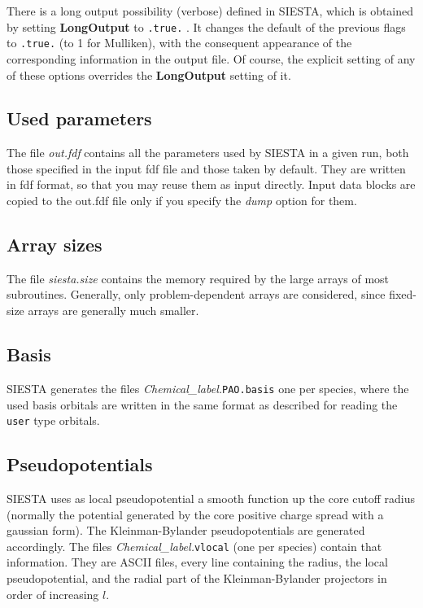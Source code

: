 There is a long output possibility (verbose) defined in SIESTA, which is
obtained by setting {\bf LongOutput} to {\tt .true.} . It changes 
the default of the previous flags to {\tt .true.} (to 1 for 
Mulliken), with the consequent appearance of the 
corresponding information in the output file.
Of course, the explicit setting of any of these options overrides the
{\bf LongOutput} setting of it.



\subsection{Used parameters}
The file {\it out.fdf} contains all the parameters used by SIESTA
in a given run, both those specified in the input fdf file and
those taken by default. They are written in fdf format, so that
you may reuse them as input directly. Input data blocks are 
copied to the out.fdf file only if you specify the {\it dump} option
for them.


\subsection{Array sizes}
 
The file {\it siesta.size} contains the memory required by the
large arrays of most subroutines. Generally, only problem-dependent
arrays are considered, since fixed-size arrays are generally much smaller.


\subsection{Basis}
SIESTA generates the files
{\it Chemical\_label.}{\tt PAO.basis}
one per species, where the used basis orbitals are written in the 
same format as described for reading the {\tt user} type orbitals.


\subsection{Pseudopotentials}
SIESTA uses as local pseudopotential a smooth function up the core cutoff
radius (normally the potential generated by the core positive charge 
spread with a gaussian form). The Kleinman-Bylander pseudopotentials
are generated accordingly. The files
{\it Chemical\_label.}{\tt vlocal}
\noindent
(one per species) contain that information. They are ASCII files, every
line containing the radius, the local pseudopotential, and the radial
part of the Kleinman-Bylander projectors in order of increasing $l$.


